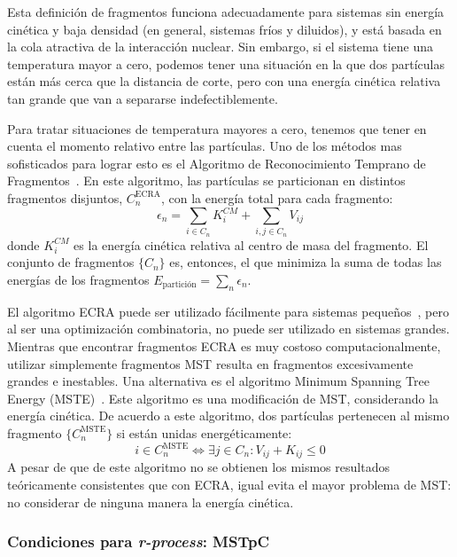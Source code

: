Esta definición de fragmentos funciona adecuadamente para sistemas sin energía cinética y baja densidad (en general, sistemas fríos y diluidos), y está basada en la cola atractiva de la interacción nuclear.
Sin embargo, si el sistema tiene una temperatura mayor a cero, podemos tener una situación en la que dos partículas están más cerca que la distancia de corte, pero con una energía cinética relativa tan grande que van a separarse indefectiblemente.

Para tratar situaciones de temperatura mayores a cero, tenemos que tener en cuenta el momento relativo entre las partículas.
Uno de los métodos mas sofisticados para lograr esto es el Algoritmo de Reconocimiento Temprano de Fragmentos~\cite{dorso_early_1993}.
En este algoritmo, las partículas se particionan en distintos fragmentos disjuntos, $C^{\text{ECRA}}_n$, con la energía total para cada fragmento:
\begin{equation*}
  \epsilon_n = \sum_{i \in C_n} K^{CM}_i +  \sum_{i,j \in C_n} V_{ij}
\end{equation*}
donde $K^{CM}_i$ es la energía cinética relativa al centro de masa del fragmento.
El conjunto de fragmentos $\{C_n\}$ es, entonces, el que minimiza la suma de todas las energías de los fragmentos $E_{\text{partición}} = \sum_n \epsilon_n$.

El algoritmo ECRA puede ser utilizado fácilmente para sistemas pequeños~\cite{dorso_fluctuation_1994}, pero al ser una optimización combinatoria, no puede ser utilizado en sistemas grandes.
Mientras que encontrar fragmentos ECRA es muy costoso computacionalmente, utilizar simplemente fragmentos MST resulta en fragmentos excesivamente grandes e inestables.
Una alternativa es el algoritmo Minimum Spanning Tree Energy (MSTE)~\cite{dorso_topological_2012}.
Este algoritmo es una modificación de MST, considerando la energía cinética.
De acuerdo a este algoritmo, dos partículas pertenecen al mismo fragmento $\{C^{\text{MSTE}}_n\}$ si están unidas energéticamente:
\begin{equation*}
  i \in C^{\text{MSTE}}_n \Leftrightarrow \exists j \in C_n :  V_{ij}+ K_{ij} \le 0
\end{equation*}
A pesar de que de este algoritmo no se obtienen los mismos resultados teóricamente consistentes que con ECRA, igual evita el mayor problema de MST: no considerar de ninguna manera la energía cinética.

\subsubsection{Condiciones para \emph{r-process}: MSTpC}

